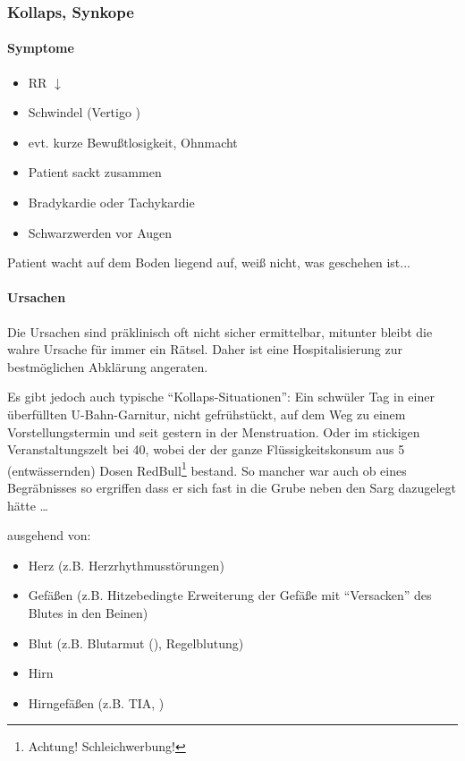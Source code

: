 \subsubsection{Kollaps, Synkope}


\paragraph{Symptome}

\begin{itemize}
    \item RR ${\downarrow}$
    \item Schwindel (Vertigo )
    \item evt. kurze Bewußtlosigkeit, Ohnmacht
    \item Patient sackt zusammen
    \item Bradykardie oder Tachykardie
    \item Schwarzwerden vor Augen
\end{itemize}

Patient wacht auf dem Boden liegend  auf, weiß nicht, was geschehen
ist...

\paragraph{Ursachen} Die Ursachen sind präklinisch oft
nicht sicher ermittelbar, mitunter bleibt die wahre Ursache
für immer ein Rätsel. Daher ist eine Hospitalisierung zur
bestmöglichen Abklärung angeraten. 

Es gibt jedoch auch typische "`Kollaps-Situationen"': Ein
schwüler Tag in einer überfüllten U-Bahn-Garnitur, nicht
gefrühstückt, auf dem Weg zu einem Vorstellungstermin und
seit gestern in der Menstruation. Oder im stickigen
Veranstaltungszelt bei 40\textdegree , wobei der der ganze
Flüssigkeitskonsum aus 5 (entwässernden) Dosen
RedBull\texttrademark\footnote{Achtung! Schleichwerbung!}
bestand. So mancher war auch ob eines Begräbnisses so
ergriffen dass er sich fast in die Grube neben den Sarg
dazugelegt hätte \ldots 

ausgehend von:

\begin{itemize}
    \item Herz (z.B. Herzrhythmusstörungen)
    \item Gefäßen (z.B. Hitzebedingte Erweiterung
    der Gefäße mit "`Versacken"' des Blutes in den Beinen)
    \item Blut (z.B. Blutarmut (),
    Regelblutung)
    \item Hirn
    \item Hirngefäßen (z.B. TIA,
     )
\end{itemize}

